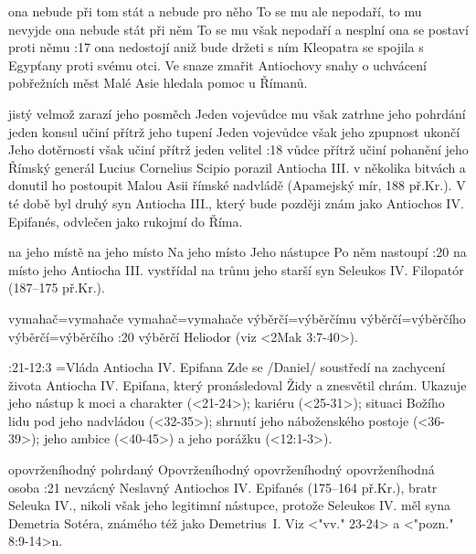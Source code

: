     {ona nebude při tom stát a nebude pro něho}   %
    {To se mu ale nepodaří, to mu nevyjde}   %
    {ona nebude stát při něm}   %
    {To se mu však nepodaří a nesplní}   %
    {ona se postaví proti němu}   %
:17 {ona nedostojí aniž bude držeti s ním}
   Kleopatra se spojila s Egypťany proti svému otci. Ve snaze zmařit Antiochovy snahy o uchvácení pobřežních měst Malé Asie hledala pomoc u Římanů.  

    {jistý velmož zarazí jeho posměch}   %
    {Jeden vojevůdce mu však zatrhne jeho pohrdání}   %
    {jeden konsul učiní přítrž jeho tupení}   %
    {Jeden vojevůdce však jeho zpupnost ukončí}   %
    {Jeho dotěrnosti však učiní přítrž jeden velitel}   %
:18 {vůdce přítrž učiní pohanění jeho}  
    Římský generál Lucius Cornelius Scipio porazil Antiocha III. v několika bitvách a donutil ho postoupit Malou Asii římské nadvládě (Apamejský mír, 188 př.Kr.). V té době byl druhý syn Antiocha III., který bude později  znám jako Antiochos IV. Epifanés, odvlečen jako rukojmí do Říma.

    {na jeho místě}   %
    {na jeho místo}   %
    {Na jeho místo}   %
    {Jeho nástupce}   %
    {Po něm nastoupí}   %
:20 {na místo jeho}
    Antiocha III. vystřídal na trůnu jeho starší syn Seleukos IV. Filopatór (187--175 př.Kr.).

    {vymahač}={vymahače}   %
    {vymahač}={vymahače}   %
    {výběrčí}={výběrčímu}   %
    {výběrčí}={výběrčího}   %
    {výběrčí}={výběrčího}   %
:20 {výběrčí}
    Heliodor (viz <2Mak 3:7-40>).
    
:21-12:3 {}={Vláda Antiocha IV. Epifana}
        Zde se \x/Daniel/ soustředí na zachycení života Antiocha IV. Epifana, který pronásledoval Židy a znesvětil chrám. Ukazuje jeho nástup k moci a charakter (<21-24>);  kariéru
        (<25-31>); situaci Božího lidu pod jeho nadvládou (<32-35>); shrnutí jeho náboženského postoje  (<36-39>); jeho ambice  (<40-45>) a jeho porážku (<12:1-3>).

    {opovrženíhodný}  %
    {pohrdaný}   %
    {Opovrženíhodný}   %
    {opovrženíhodný}   %
    {opovrženíhodná osoba}   %
:21 {nevzácný} 
        Neslavný Antiochos IV. Epifanés (175--164 př.Kr.), bratr Seleuka IV., nikoli však jeho legitimní nástupce, protože Seleukos IV. měl syna Demetria Sotéra, známého též jako Demetrius~I. Viz <"vv." 23-24> a <"pozn." 8:9-14>n.

